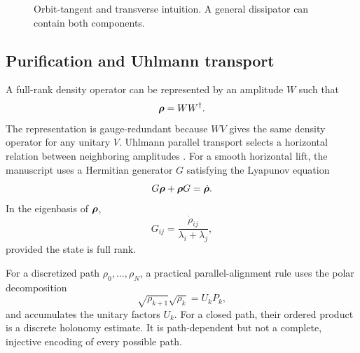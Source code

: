 \begin{figure}[H]
\centering
{}
\caption{Orbit-tangent and transverse intuition. A general dissipator can contain both components.}
\label{fig:bloch}
\end{figure}

\subsection{Purification and Uhlmann transport}

A full-rank density operator can be represented by an amplitude $W$ such that
\[
\bm{\rho}=WW^\dagger.
\]
The representation is gauge-redundant because $WV$ gives the same density operator for any unitary $V$. Uhlmann parallel transport selects a horizontal relation between neighboring amplitudes \citep{uhlmann1986,uhlmann1991}. For a smooth horizontal lift, the manuscript uses a Hermitian generator $G$ satisfying the Lyapunov equation
\begin{equation}
G\bm{\rho}+\bm{\rho} G=\dot{\bm{\rho}}.
\label{eq:lyapunov}
\end{equation}
In the eigenbasis of $\bm{\rho}$,
\begin{equation}
G_{ij}=\frac{\dot\rho_{ij}}{\lambda_i+\lambda_j},
\label{eq:g_elements}
\end{equation}
provided the state is full rank.

For a discretized path $\rho_0,\ldots,\rho_N$, a practical parallel-alignment rule uses the polar decomposition
\[
\sqrt{\rho_{k+1}}\sqrt{\rho_k}=U_k P_k,
\]
and accumulates the unitary factors $U_k$. For a closed path, their ordered product is a discrete holonomy estimate. It is path-dependent but not a complete, injective encoding of every possible path.

